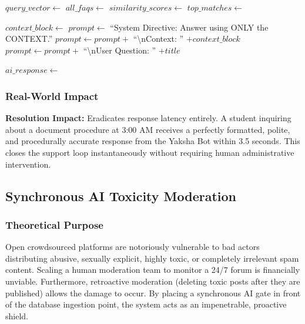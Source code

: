 \documentclass[12pt,a4paper]{article}
\begin{document}
\begin{algorithm}
\caption{Deep Auto-Answer Daemon (RAG Implementation)}
\begin{algorithmic}[1]
    \State $query\_vector \gets$ 
    \State $all\_faqs \gets$ 
    \State $similarity\_scores \gets$ 
    \State $top\_matches \gets$ 
    
        \State $context\_block \gets$ 
        \State $prompt \gets$ ``System Directive: Answer using ONLY the CONTEXT.'' 
        \State $prompt \gets prompt +$ ``\textbackslash nContext: '' $+ context\_block$
        \State $prompt \gets prompt +$ ``\textbackslash nUser Question: '' $+ title$
        
        \State $ai\_response \gets$ 
        \State {}
        \State {}
    \Else
        \State \Return {}
    \EndIf
\EndProcedure
\end{algorithmic}
\end{algorithm}

\subsubsection{Real-World Impact}
\textbf{Resolution Impact:} Eradicates response latency entirely. A student inquiring about a document procedure at 3:00 AM receives a perfectly formatted, polite, and procedurally accurate response from the Yaksha Bot within 3.5 seconds. This closes the support loop instantaneously without requiring human administrative intervention.

\newpage

\subsection{Synchronous AI Toxicity Moderation}

\subsubsection{Theoretical Purpose}
Open crowdsourced platforms are notoriously vulnerable to bad actors distributing abusive, sexually explicit, highly toxic, or completely irrelevant spam content. Scaling a human moderation team to monitor a 24/7 forum is financially unviable. Furthermore, retroactive moderation (deleting toxic posts after they are published) allows the damage to occur. By placing a synchronous AI gate in front of the database ingestion point, the system acts as an impenetrable, proactive shield.
\end{document}

